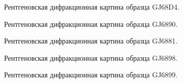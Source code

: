   \begin{figure}[ht]
    \caption{Рентгеновская дифракционная картина образца GJ68D4.}\label{fig:fig}
  \end{figure}

  \begin{figure}[ht]
    \caption{Рентгеновская дифракционная картина образца GJ6890.}\label{fig:fig}
  \end{figure}

  \begin{figure}[ht]
    \caption{Рентгеновская дифракционная картина образца GJ6881.}\label{fig:fig}
  \end{figure}

  \begin{figure}[ht]
    \caption{Рентгеновская дифракционная картина образца GJ6898.}\label{fig:fig}
  \end{figure}

  \begin{figure}[ht]
    \caption{Рентгеновская дифракционная картина образца GJ6899.}\label{fig:fig}
  \end{figure}